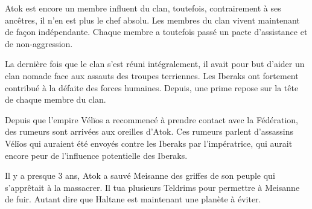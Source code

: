 Atok est encore un membre influent du clan, toutefois, contrairement à ses ancêtres, il n'en est plus le chef absolu. Les membres du clan vivent maintenant de façon indépendante. Chaque membre a toutefois passé un pacte d'assistance et de non-aggression.

La dernière fois que le clan s'est réuni intégralement, il avait pour but d'aider un clan nomade face aux assauts des troupes terriennes. Les Iberaks ont fortement contribué à la défaite des forces humaines. Depuis, une prime repose sur la tête de chaque membre du clan.

Depuis que l'empire Vélïos a recommencé à prendre contact avec la Fédération, des rumeurs sont arrivées aux oreilles d'Atok. Ces rumeurs parlent d'assassins Vélïos qui auraient été envoyés contre les Iberaks par l'impératrice, qui aurait encore peur de l'influence potentielle des Iberaks.

Il y a presque 3 ans, Atok a sauvé Meisanne des griffes de son peuple qui s'apprêtait à la massacrer. Il tua plusieurs Teldrims pour permettre à Meisanne de fuir. Autant dire que Haltane est maintenant une planète à éviter.

\clearpage

